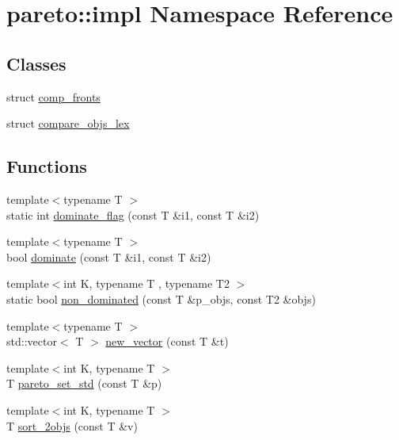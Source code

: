 \hypertarget{namespacepareto_1_1impl}{}\section{pareto\+:\+:impl Namespace Reference}
\label{namespacepareto_1_1impl}
\subsection*{Classes}
\begin{DoxyCompactItemize}
\item 
struct \hyperlink{structpareto_1_1impl_1_1comp__fronts}{comp\+\_\+fronts}
\item 
struct \hyperlink{structpareto_1_1impl_1_1compare__objs__lex}{compare\+\_\+objs\+\_\+lex}
\end{DoxyCompactItemize}
\subsection*{Functions}
\begin{DoxyCompactItemize}
\item 
{\footnotesize template$<$typename T $>$ }\\static int \hyperlink{namespacepareto_1_1impl_ac248587c36b8f38a97a861e577eeb96b}{dominate\+\_\+flag} (const T \&i1, const T \&i2)
\item 
{\footnotesize template$<$typename T $>$ }\\bool \hyperlink{namespacepareto_1_1impl_ac1f6d530e715b53229587f2e6297768d}{dominate} (const T \&i1, const T \&i2)
\item 
{\footnotesize template$<$int K, typename T , typename T2 $>$ }\\static bool \hyperlink{namespacepareto_1_1impl_a6e03440a64bc1f6df847a2bbfa9984e9}{non\+\_\+dominated} (const T \&p\+\_\+objs, const T2 \&objs)
\item 
{\footnotesize template$<$typename T $>$ }\\std\+::vector$<$ T $>$ \hyperlink{namespacepareto_1_1impl_af350eeaea041bc44a3ad385036bb0a88}{new\+\_\+vector} (const T \&t)
\item 
{\footnotesize template$<$int K, typename T $>$ }\\T \hyperlink{namespacepareto_1_1impl_aa57ee41edb977d9956e26876a34b0a6b}{pareto\+\_\+set\+\_\+std} (const T \&p)
\item 
{\footnotesize template$<$int K, typename T $>$ }\\T \hyperlink{namespacepareto_1_1impl_a8a1d8e9ccce2559452fc0dd22662f6cb}{sort\+\_\+2objs} (const T \&v)
\end{DoxyCompactItemize}


